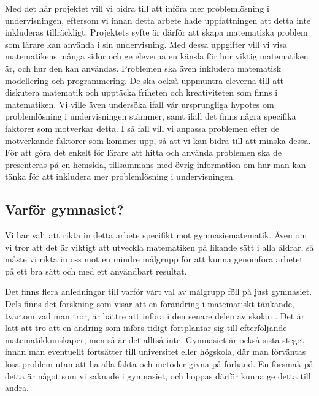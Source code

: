 \textcolor{lila}{Med det här projektet vill vi bidra till att införa mer problemlösning i undervisningen, eftersom vi innan detta arbete hade uppfattningen att detta inte inkluderas tillräckligt. Projektets syfte är därför att skapa matematiska problem som lärare kan använda i sin undervisning. Med dessa uppgifter vill vi visa matematikens många sidor och ge eleverna en känsla för hur viktig matematiken är, och hur den kan användas. Problemen ska även inkludera matematisk modellering och programmering. De ska också uppmuntra eleverna till att diskutera matematik och upptäcka friheten och kreativiteten som finns i matematiken. Vi ville även undersöka ifall vår ursprungliga hypotes om problemlösning i undervisningen stämmer, samt ifall det finns några specifika faktorer som motverkar detta. I så fall vill vi anpassa problemen efter de motverkande faktorer som kommer upp, så att vi kan bidra till att minska dessa. För att göra det enkelt för lärare att hitta och använda problemen ska de presenteras på en hemsida, tillsammans med övrig information om hur man kan tänka för att inkludera mer problemlösning i undervisningen.}


\subsection{Varför gymnasiet?}
\textcolor{lila}{
    Vi har valt att rikta in detta arbete specifikt mot gymnasiematematik. Även om vi tror att det är viktigt att utveckla matematiken på likande sätt i alla åldrar, så måste vi rikta in oss mot en mindre målgrupp för att kunna genomföra arbetet på ett bra sätt och med ett användbart resultat. }
    
\textcolor{lila}{
    Det finns flera anledningar till varför vårt val av målgrupp föll på just gymnasiet. Dels finns det forskning som visar att en förändring i matematiskt tänkande, tvärtom vad man tror, är bättre att införa i den senare delen av skolan \cite{TheElephant}. Det är lätt att tro att en ändring som införs tidigt fortplantar sig till efterföljande matematikkunskaper, men så är det alltså inte. Gymnasiet är också sista steget innan man eventuellt fortsätter till universitet eller högskola, där man förväntas lösa problem utan att ha alla fakta och metoder givna på förhand. En försmak på detta är något som vi saknade i gymnasiet, och hoppas därför kunna ge detta till andra.}
    
